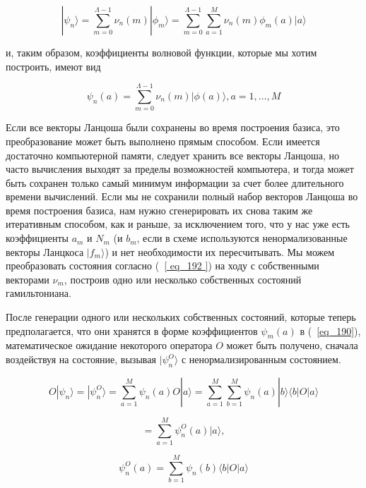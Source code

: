 \documentclass[11pt]{article}
\begin{document}
\begin{equation}
|\psi_n \rangle = \sum\limits_{m=0}^{\Lambda -1 }\nu_n (m)|\phi_m \rangle = \sum\limits_{m=0}^{\Lambda-1}\sum_{a=1}^{M}\nu_n(m)\phi_m(a)|a\rangle
\label{eq_191}
\end{equation}

и, таким образом, коэффициенты волновой функции, которые мы хотим построить, имеют вид

\begin{equation}
\psi_n (a)  = \sum\limits_{m=0}^{\Lambda -1 }\nu_n (m)|\phi(a) \rangle, a = 1, \dots, M
\label{eq_192}
\end{equation}

Если все векторы Ланцоша были сохранены во время построения базиса, это преобразование может быть выполнено прямым способом. Если имеется достаточно компьютерной памяти, следует хранить все векторы Ланцоша, но часто вычисления выходят за пределы возможностей компьютера, и тогда может быть сохранен только самый минимум информации за счет более длительного времени вычислений. Если мы не сохранили полный набор векторов Ланцоша во время построения базиса, нам нужно сгенерировать их снова таким же итеративным способом, как и раньше, за исключением того, что у нас уже есть коэффициенты $a_m$ и $N_m$ (и $b_m$, если в схеме используются ненормализованные векторы Ланцкоса $| f_m \rangle $) и нет необходимости их пересчитывать. Мы можем преобразовать состояния согласно (~\ref{ eq_192 }) на ходу с собственными векторами $\nu_m$, построив одно или несколько собственных состояний гамильтониана.

После генерации одного или нескольких собственных состояний, которые теперь предполагается, что они хранятся в форме коэффициентов $\psi_m(a)$ в (~\ref{eq_190}), математическое ожидание некоторого оператора $O$ может быть получено, сначала воздействуя на состояние, вызывая $|\psi_n^O \rangle$ с ненормализированным состоянием.

\begin{equation}
O|\psi_n\rangle = |\psi_n^O\rangle = \sum\limits_{a=1}^{M}\psi_n(a)O|a\rangle = \sum\limits_{a=1}^{M}\sum\limits_{b=1}^{M}\psi_n(a)|b \rangle \langle b | O | a \rangle 
\label{eq_193}
\end{equation}

\begin{equation*}
= \sum\limits_{a=1}^{M}\psi_n^O(a) | a \rangle , 
\end{equation*}

\begin{equation*}
\psi_n^O(a)=\sum_{b=1}^{M}\psi_n(b) \langle b | O | a \rangle
\end{equation*}
\end{document}

